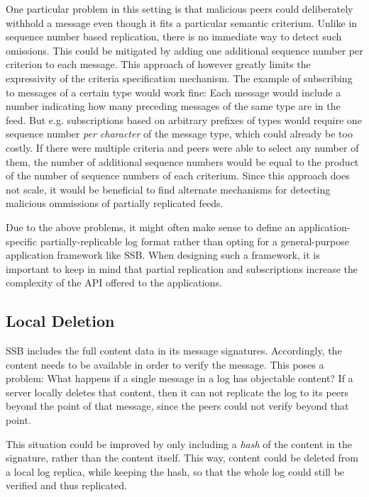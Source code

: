 \documentclass[sigconf]{acmart}
\begin{document}
One particular problem in this setting is that malicious peers could deliberately withhold a message even though it fits a particular semantic criterium. Unlike in sequence number based replication, there is no immediate way to detect such omissions. This could be mitigated by adding one additional sequence number per criterion to each message. This approach of however greatly limits the expressivity of the criteria specification mechanism. The example of subscribing to messages of a certain type would work fine: Each message would include a number indicating how many preceding messages of the same type are in the feed. But e.g. subscriptions based on arbitrary prefixes of types would require one sequence number {\em per character} of the message type, which could already be too costly. If there were multiple criteria and peers were able to select any number of them, the number of additional sequence numbers would be equal to the product of the number of sequence numbers of each criterium. Since this approach does not scale, it would be beneficial to find alternate mechanisms for detecting malicious ommissions of partially replicated feeds.

Due to the above problems, it might often make sense to define an application-specific partially-replicable log format rather than opting for a general-purpose application framework like SSB. When designing such a framework, it is important to keep in mind that partial replication and subscriptions increase the complexity of the API offered to the applications.

\subsection{Local Deletion}

SSB includes the full content data in its message signatures. Accordingly, the content needs to be available in order to verify the message. This poses a problem: What happens if a single message in a log has objectable content? If a server locally deletes that content, then it can not replicate the log to its peers beyond the point of that message, since the peers could not verify beyond that point.

This situation could be improved by only including a {\em hash} of the content in the signature, rather than the content itself. This way, content could be deleted from a local log replica, while keeping the hash, so that the whole log could still be verified and thus replicated.
\end{document}
